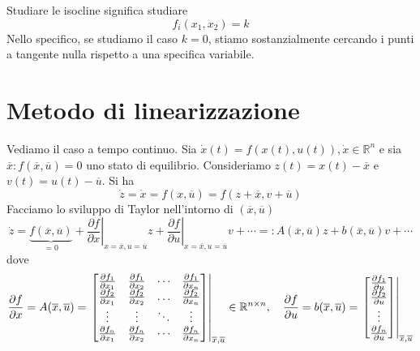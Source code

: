 Studiare le isocline significa studiare
\begin{equation*}
	f_i(x_1 ,x_2) =k
\end{equation*}
Nello specifico, se studiamo il caso $k=0$, stiamo sostanzialmente cercando i punti a tangente nulla rispetto a una specifica variabile.

\section{Metodo di linearizzazione}

Vediamo il caso a tempo continuo. Sia $\dot{x}(t) =f(x(t),u(t)) ,\dot{x} \in \mathbb{R}^n$ e sia $\overline{x} :f(\overline{x},\overline{u}) =0$ uno stato di equilibrio. Consideriamo $z(t) =x(t) -\overline{x}$ e $v(t)=u(t)-\overline{u}$. Si ha
\begin{equation*}
	\dot{z} =\dot{x} =f(x,\overline{u})=f(z+\overline{x},v+\overline{u})
\end{equation*}
Facciamo lo sviluppo di Taylor nell'intorno di $(\overline{x},\overline{u})$
\begin{equation*}
	\dot{z} =\underbrace{f(\overline{x},\overline{u})}_{=0} +\left. \frac{\partial f}{\partial x}\right| _{x=\overline{x},u=\overline{u}} z+\left. \frac{\partial f}{\partial u}\right| _{x=\overline{x},u=\overline{u}} v+\cdots =:A(\overline{x},\overline{u}) z+b(\overline{x},\overline{u})v+\cdots 
\end{equation*}
dove
\begin{equation*}
	\frac{\partial f}{\partial x} =A(\overline{x},\overline{u})=\left.\begin{bmatrix}
	\frac{\partial f_1}{\partial x_1} & \frac{\partial f_1}{\partial x_2} & \cdots  & \frac{\partial f_1}{\partial x_n}\\
	\frac{\partial f_2}{\partial x_1} & \frac{\partial f_2}{\partial x_2} & \dotsc  & \frac{\partial f_2}{\partial x_n}\\
	\vdots  & \vdots  & \ddots  & \vdots \\
	\frac{\partial f_n}{\partial x_1} & \frac{\partial f_n}{\partial x_2} & \cdots  & \frac{\partial f_n}{\partial x_n}
	\end{bmatrix}\right |_{\overline{x},\overline{u}} \in \mathbb{R}^{n\times n},\quad \frac{\partial f}{\partial u}=b(\overline{x},\overline{u})=\left.\begin{bmatrix}
	    \partial f_1\over \partial u\\
        \partial f_2\over \partial u\\
        \vdots\\
        \partial f_n \over \partial u
	\end{bmatrix}\right|_{\overline{x},\overline{u}}
\end{equation*}
